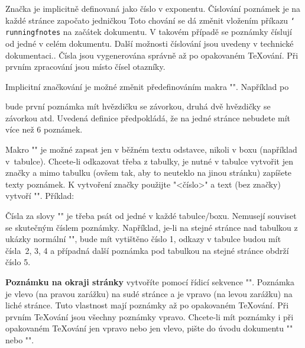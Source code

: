 Značka je implicitně definovaná jako číslo v exponentu.
Číslování poznámek je na každé stránce započato
jedničkou\fnote
{Toto chování se dá změnit vložením příkazu {\tt\char`\\runningfnotes} na
začátek dokumentu. V takovém případě se poznámky číslují od jedné v celém
dokumentu. Další možnosti číslování jsou uvedeny v technické dokumentaci.}.
Čísla jsou vygenerována správně až po
opakovaném \TeX{}ování. Při prvním zpracování jsou místo čísel otazníky.

Implicitní značkování je možné změnit předefinováním makra "\thefnote".
Například po

\begtt
\def\thefnote{\ifcase\locfnum\or
   *\or**\or***\or$^{\dag}$\or$^{\ddag}$\or$^{\dag\dag}$\fi)}
\endtt
%
bude první poznámka mít hvězdičku se závorkou, druhá dvě hvězdičky se
závorkou atd. Uvedená definice předpokládá, že na jedné stránce nebudete mít
více než 6 poznámek.

Makro "\fnote" je možné zapsat jen v běžném textu odstavce, nikoli v boxu
(například v~tabulce). Chcete-li odkazovat třeba z tabulky, je nutné v
tabulce vytvořit jen značky a mimo tabulku (ovšem tak, aby to neuteklo na
jinou stránku) zapíšete texty poznámek. K vytvoření značky použijte
"\fnotemark<číslo>" a text (bez značky) vytvoří "".
Příklad:

\begtt
{\typoscale[/1200]}
\par\nobreak {}
\endtt
%
Čísla za slovy "\fnotemark" je třeba psát od jedné v každé tabulce/boxu.
Nemusejí souviset se skutečným číslem poznámky. Například, je-li na stejné stránce nad 
tabulkou z ukázky normální "\fnote", bude mít vytištěno číslo 1, 
odkazy v tabulce budou mít čísla~2, 3, 4 a případná další poznámka pod
tabulkou na stejné stránce obdrží číslo 5.

{\bf Poznámku na okraji stránky} vytvoříte pomocí řídicí sekvence
"". Poznámka je vlevo (na pravou zarážku) na sudé stránce a je
vpravo (na levou zarážku) na liché stránce. Tuto vlastnost mají poznámky až
po opakovaném \TeX{}ování. Při prvním \TeX{}ování jsou všechny poznámky vpravo.
Chcete-li mít poznámky i při opakovaném \TeX{}ování jen vpravo nebo jen
vlevo, pište do úvodu dokumentu "\fixmnotes\right" nebo "\fixmnotes\left".


